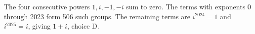 The four consecutive powers $1,i,-1,-i$ sum to zero. The terms with exponents 0 through 2023 form 506 such groups. The remaining terms are $i^{2024}=1$ and $i^{2025}=i$, giving $\boxed{1+i}$, choice D.
